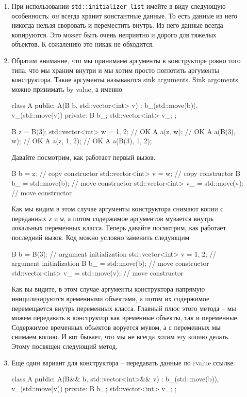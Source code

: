 \begin{enumerate}
\item При использовании \verb"std::initializer_list" имейте в виду следующую особенность: он всегда хранит константные данные.
То есть данные из него никогда нельзя своровать и переместить внутрь.
Из него данные всегда копируются.
Это может быть очень неприятно и дорого для тяжелых объектов.
К сожалению это никак не обходится.

\item Обратим внимание, что мы принимаем аргументы в конструкторе ровно того типа, что мы храним внутри и мы хотим просто поглотить аргументы конструктора.
Такие аргументы называются sink arguments.
Sink argoments можно принимать by value, а именно
\begin{cppcode}
class A {
public:
  A(B b, std::vector<int> v)
   : b_(std::move(b)), v_(std::move(v)) {}
private:
  B b_;
  std::vector<int> v_;
};

B z = B(3);
std::vector<int> w = {1, 2};
// OK
A a(z, w);
// OK
A a(B(3), w);
// OK
A a(z, {1, 2});
// OK
A a(B(3), {1, 2});
\end{cppcode}
Давайте посмотрим, как работает первый вызов.
\begin{cppcode}
B b = z; // copy constructor
std::vector<int> v = w; // copy constructor
B b_ = std::move(b); // move constructor
std::vector<int> v_ = std::move(v); // move constructor
\end{cppcode}
Как мы видим в этом случае аргументы конструктора снимают копии с переданных \verb"z" и \verb"w", а потом содержимое аргументов мувается внутрь локальных переменных класса.
Теперь давайте посмотрим, как работает последний вызов.
Код можно условно заменить следующим
\begin{cppcode}
B b = B(3); // argument initialization
std::vector<int> v = {1, 2}; // argument initialization
B b_ = std::move(b); // move constructor
std::vector<int> v_ = std::move(v); // move constructor
\end{cppcode}
Как вы видите, в этом случае аргументы конструктора напрямую иницилизируются временными объектами, а потом их содержимое перемещается внутрь переменных класса.
Главный плюс этого метода -- мы можем передавать в конструктор как временные объекты, так и переменные.
Содержимое временных объектов воруется мувом, а с переменных мы снимаем копию.
И вот бывает, что мы не всегда хотим эту копию делать.
Этому посвящен следующий метод.

\item Еще один вариант для конструктора -- передавать данные по rvalue ссылке:
\begin{cppcode}
class A {
public:
  A(B&& b, std::vector<int>&& v)
   : b_(std::move(b)), v_(std::move(v)) {}
private:
  B b_;
  std::vector<int> v_;
};


\end{cppcode}
\end{enumerate}
